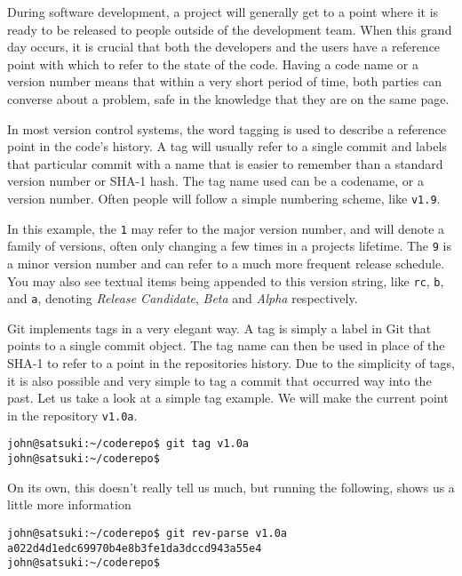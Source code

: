 During software development, a project will generally get to a point where it is ready to be released to people outside of the development team.  When this grand day occurs, it is crucial that both the developers and the users have a reference point with which to refer to the state of the code.  Having a code name or a version number means that within a very short period of time, both parties can converse about a problem, safe in the knowledge that they are on the same page.

In most version control systems, the word tagging is used to describe a reference point in the code's history.  A tag will usually refer to a single commit and labels that particular commit with a name that is easier to remember than a standard version number or SHA-1 hash.  The tag name used can be a codename, or a version number.  Often people will follow a simple numbering scheme, like \texttt{v1.9}.  

In this example, the \texttt{1} may refer to the major version number, and will denote a family of versions, often only changing a few times in a projects lifetime.  The \texttt{9} is a minor version number and can refer to a much more frequent release schedule.  You may also see textual items being appended to this version string, like \texttt{rc}, \texttt{b}, and \texttt{a}, denoting \emph{Release Candidate}, \emph{Beta} and \emph{Alpha} respectively.

Git implements tags in a very elegant way.  A tag is simply a label in Git that points to a single commit object.  The tag name can then be used in place of the SHA-1 to refer to a point in the repositories history.  Due to the simplicity of tags, it is also possible and very simple to tag a commit that occurred way into the past.  Let us take a look at a simple tag example.  We will make the current point in the repository \texttt{v1.0a}.

\begin{Verbatim}[frame=leftline,framerule=1mm,fontsize=\relsize{-3}] 
john@satsuki:~/coderepo$ git tag v1.0a
john@satsuki:~/coderepo$ 
\end{Verbatim}

On its own, this doesn't really tell us much, but running the following, shows us a little more information

\begin{Verbatim}[frame=leftline,framerule=1mm,fontsize=\relsize{-3}] 
john@satsuki:~/coderepo$ git rev-parse v1.0a
a022d4d1edc69970b4e8b3fe1da3dccd943a55e4
john@satsuki:~/coderepo$ 
\end{Verbatim}

